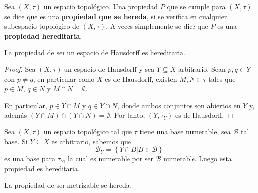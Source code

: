 \documentclass[12pt]{report}
\theoremstyle{largebreak}
\begin{document}
    \begin{mydef}
        Sea $(X,\tau)$ un espacio topológico. Una propiedad $P$ que se cumple para $(X,\tau)$ se dice que es una \textbf{propiedad que se hereda}, si se verifica en cualquier subespacio topológico de $(X,\tau)$. A veces simplemente se dice que $P$ es una \textbf{propiedad hereditaria}.
    \end{mydef}

    \begin{exa}
        La propiedad de ser un espacio de Hausdorff es hereditaria.
    \end{exa}

    \begin{proof}
        Sea $(X,\tau)$ un espacio de Hausdorff y sea $Y\subseteq X$ arbitrario. Sean $p,q\in Y$ con $p\neq q$, en particular como $X$ es de Hausdorff, existen $M,N\in\tau$ tales que $p\in M$, $q\in N$ y $M\cap N=\emptyset$.

        En particular, $p\in Y\cap M$ y $q\in Y\cap N$, donde ambos conjuntos son abiertos en $Y$ y, además $(Y\cap M)\cap (Y\cap N)=\emptyset$. Por tanto, $(Y,\tau_Y)$ es de Hausdorff.
    \end{proof}

    \begin{exa}
        Sea $(X,\tau)$ un espacio topológico tal que $\tau$ tiene una base numerable, sea $\mathcal{B}$ tal base. Si $Y\subseteq X$ es arbitrario, sabemos que
        \begin{equation*}
            \mathcal{B}_Y=\left\{Y\cap B\Big|B\in\mathcal{B} \right\}
        \end{equation*}
        es una base para $\tau_Y$, la cual es numerable por ser $\mathcal{B}$ numerable. Luego esta propiedad es hereditaria.
    \end{exa}

    \begin{excer}
        La propiedad de ser metrizable se hereda.
    \end{excer}
\end{document}
